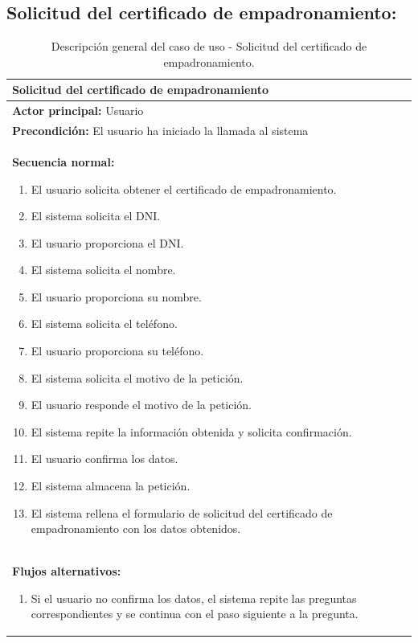 \documentclass[12pt, a4paper, twoside]{report}
\begin{document}
        \subsection{Solicitud del certificado de empadronamiento:}
            \begin{table}[H]
            \centering
            \begin{tabular}{|p{16cm}|} 
            \hline
            \textbf{Solicitud del certificado de empadronamiento} \\ \hline
            \textbf{Actor principal:} Usuario \\ \hline
            \textbf{Precondición:} El usuario ha iniciado la llamada al sistema \\ \hline
            \textbf{Secuencia normal:}
                \begin{enumerate}
                    \item El usuario solicita obtener el certificado de empadronamiento.
                    \item El sistema solicita el DNI.
                    \item El usuario proporciona el DNI.
                    \item El sistema solicita el nombre.
                    \item El usuario proporciona su nombre.
                    \item El sistema solicita el teléfono.
                    \item El usuario proporciona su teléfono.
                    \item El sistema solicita el motivo de la petición.
                    \item El usuario responde el motivo de la petición.
                    \item El sistema repite la información obtenida y solicita confirmación. 
                    \item El usuario confirma los datos.
                    \item El sistema almacena la petición.
                    \item El sistema rellena el formulario de solicitud del certificado de empadronamiento con los datos obtenidos.
                \end{enumerate} \\ \hline
            \textbf{Flujos alternativos:}
                \begin{enumerate}
                    \item[11.a] Si el usuario no confirma los datos, el sistema repite las preguntas correspondientes y se continua con el paso siguiente a la pregunta.
                \end{enumerate} \\ \hline
            \end{tabular}
            \caption{Descripción general del caso de uso - Solicitud del certificado de empadronamiento.}
            \end{table}
        
\end{document}
